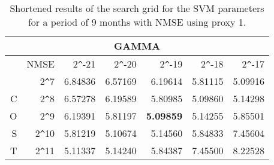 \begin{table}[h!]
\centering
\begin{adjustbox}{width=\textwidth}
\begin{tabular}{|r|r|rrrrr|}
\hline
\multicolumn{7}{|c|}{GAMMA} \tabularnewline
 \hline
 &NMSE& 2\verb|^|-21 & 2\verb|^|-20 & 2\verb|^|-19 & 2\verb|^|-18 & 2\verb|^|-17 \\ 
  \hline
  &2\verb|^|7 & 6.84836 & 6.57169 & 6.19614 & 5.81115 & 5.09916 \\ 
  C&2\verb|^|8 & 6.57278 & 6.19589 & 5.80985 & 5.09860 & 5.14298 \\ 
  O&2\verb|^|9 & 6.19391 & 5.81197 & \textbf{5.09859} & 5.14255 & 5.85501 \\ 
  S&2\verb|^|10 & 5.81219 & 5.10674 & 5.14560 & 5.84833 & 7.45604 \\ 
  T&2\verb|^|11 & 5.11337 & 5.14240 & 5.84387 & 7.45500 & 8.22528 \\ 
   \hline
\end{tabular}
\end{adjustbox}
\caption{Shortened results of the search grid for the SVM parameters for a period of 9 months with NMSE using proxy 1.}
\end{table}